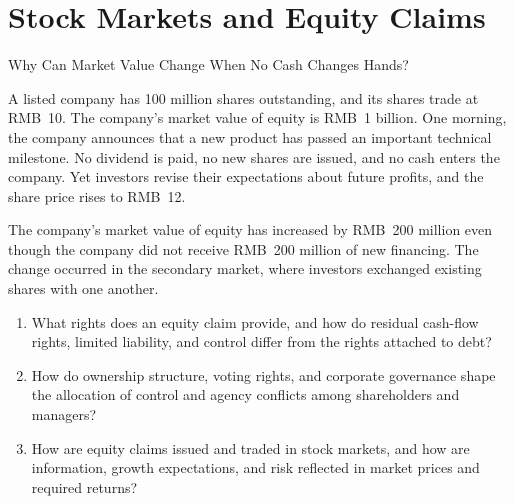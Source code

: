 \chapter{Stock Markets and Equity Claims}
\label{chap:Stock_Markets_and_Equity_Claims}

\begin{openingcase}{Why Can Market Value Change When No Cash Changes Hands?}

A listed company has 100 million shares outstanding, and its shares trade at RMB~10. The company's market value of equity is RMB~1 billion. One morning, the company announces that a new product has passed an important technical milestone. No dividend is paid, no new shares are issued, and no cash enters the company. Yet investors revise their expectations about future profits, and the share price rises to RMB~12.

The company's market value of equity has increased by RMB~200 million even though the company did not receive RMB~200 million of new financing. The change occurred in the secondary market, where investors exchanged existing shares with one another.

\end{openingcase}

\begin{tcolorbox}[
  enhanced,
  colback=FinanceBlue!6,
  colframe=FinanceBlue,
  boxrule=0.6pt,
  sharp corners,
  left=8pt,
  right=8pt,
  top=7pt,
  bottom=7pt,
  before skip=1em,
  after skip=1.6em,
  title=\textbf{Core Questions},
  coltitle=white,
  colbacktitle=FinanceBlue,
  fonttitle=\bfseries,
  attach boxed title to top left={xshift=6pt,yshift=-2mm},
  boxed title style={
    boxrule=0pt,
    sharp corners,
    left=5pt,
    right=5pt,
    top=2pt,
    bottom=2pt
  }
]
\begin{enumerate}[
  leftmargin=*,
  label=\textcolor{FinanceBlue}{\textbf{\arabic*.}},
  itemsep=0.55em,
  topsep=0.2em
]

\item What rights does an equity claim provide, and
how do residual cash-flow rights, limited liability,
and control differ from the rights attached to debt?

\item How do ownership structure, voting rights, and
corporate governance shape the allocation of control
and agency conflicts among shareholders and managers?

\item How are equity claims issued and traded in stock
markets, and how are information, growth expectations,
and risk reflected in market prices and required returns?

\end{enumerate}
\end{tcolorbox}

